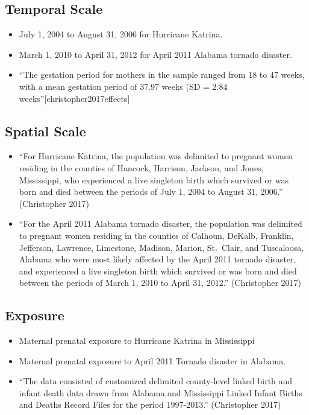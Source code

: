 \documentclass[
]{article}
\providecommand{\tightlist}{%
  \setlength{\itemsep}{0pt}\setlength{\parskip}{0pt}}
\begin{document}
\hypertarget{temporal-scale-8}{%
\subsection{Temporal Scale}\label{temporal-scale-8}}

\begin{itemize}
\tightlist
\item
  July 1, 2004 to August 31, 2006 for Hurricane Katrina.
\item
  March 1, 2010 to April 31, 2012 for April 2011 Alabama tornado
  disaster.
\item
  ``The gestation period for mothers in the sample ranged from 18 to 47
  weeks, with a mean gestation period of 37.97 weeks (SD = 2.84
  weeks''{[}christopher2017effects{]}
\end{itemize}

\hypertarget{spatial-scale-11}{%
\subsection{Spatial Scale}\label{spatial-scale-11}}

\begin{itemize}
\tightlist
\item
  ``For Hurricane Katrina, the population was delimited to pregnant
  women residing in the counties of Hancock, Harrison, Jackson, and
  Jones, Mississippi, who experienced a live singleton birth which
  survived or was born and died between the periods of July 1, 2004 to
  August 31, 2006.'' (Christopher 2017)
\item
  ``For the April 2011 Alabama tornado disaster, the population was
  delimited to pregnant women residing in the counties of Calhoun,
  DeKalb, Franklin, Jefferson, Lawrence, Limestone, Madison, Marion,
  St.~Clair, and Tuscaloosa, Alabama who were most likely affected by
  the April 2011 tornado disaster, and experienced a live singleton
  birth which survived or was born and died between the periods of March
  1, 2010 to April 31, 2012.'' (Christopher 2017)
\end{itemize}

\hypertarget{exposure-5}{%
\subsection{Exposure}\label{exposure-5}}

\begin{itemize}
\tightlist
\item
  Maternal prenatal exposure to Hurricane Katrina in Mississippi
\item
  Maternal prenatal exposure to April 2011 Tornado disaster in Alabama.
\item
  ``The data consisted of customized delimited county-level linked birth
  and infant death data drawn from Alabama and Mississippi Linked Infant
  Births and Deaths Record Files for the period 1997-2013.''
  (Christopher 2017)
\end{itemize}
\end{document}
